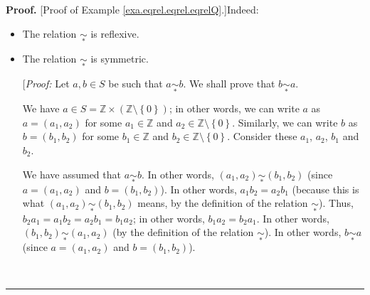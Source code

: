 \documentclass[numbers=enddot,12pt,final,onecolumn,notitlepage]{scrartcl}%
\numberwithin{exer}{subsection}
\theoremstyle{definition}
\newenvironment{fineprint}{\begin{small}}{\end{small}}
\newenvironment{proof}[1][Proof]{\noindent\textbf{#1.} }{\ \rule{0.5em}{0.5em}}
\begin{document}
\begin{proof}
[Proof of Example \ref{exa.eqrel.eqrel.eqrelQ}.]Indeed:

\begin{itemize}
\item The relation $\underset{\ast}{\sim}$ is reflexive.

\begin{fineprint}
[\textit{Proof:} Let $a\in S$. Thus, $a\in S=\mathbb{Z}\times\left(
\mathbb{Z}\setminus\left\{  0\right\}  \right)  $; in other words, we can
write $a$ as $a=\left(  a_{1},a_{2}\right)  $ for some $a_{1}\in\mathbb{Z}$
and $a_{2}\in\mathbb{Z}\setminus\left\{  0\right\}  $. Consider these $a_{1}$
and $a_{2}$.

Clearly, $a_{1}a_{2}=a_{2}a_{1}$. In other words, $\left(  a_{1},a_{2}\right)
\underset{\ast}{\sim}\left(  a_{1},a_{2}\right)  $ (because the definition of
the relation $\underset{\ast}{\sim}$ yields that $\left(  a_{1},a_{2}\right)
\underset{\ast}{\sim}\left(  a_{1},a_{2}\right)  $ means $a_{1}a_{2}%
=a_{2}a_{1}$). In other words, $a\underset{\ast}{\sim}a$ (since $a=\left(
a_{1},a_{2}\right)  $).

Now, forget that we fixed $a$. We thus have shown that every $a\in S$
satisfies $a\underset{\ast}{\sim}a$. In other words, the relation
$\underset{\ast}{\sim}$ is reflexive.]
\end{fineprint}

\item The relation $\underset{\ast}{\sim}$ is symmetric.

\begin{fineprint}
[\textit{Proof:} Let $a,b\in S$ be such that $a\underset{\ast}{\sim}b$. We
shall prove that $b\underset{\ast}{\sim}a$.

We have $a\in S=\mathbb{Z}\times\left(  \mathbb{Z}\setminus\left\{  0\right\}
\right)  $; in other words, we can write $a$ as $a=\left(  a_{1},a_{2}\right)
$ for some $a_{1}\in\mathbb{Z}$ and $a_{2}\in\mathbb{Z}\setminus\left\{
0\right\}  $. Similarly, we can write $b$ as $b=\left(  b_{1},b_{2}\right)  $
for some $b_{1}\in\mathbb{Z}$ and $b_{2}\in\mathbb{Z}\setminus\left\{
0\right\}  $. Consider these $a_{1}$, $a_{2}$, $b_{1}$ and $b_{2}$.

We have assumed that $a\underset{\ast}{\sim}b$. In other words, $\left(
a_{1},a_{2}\right)  \underset{\ast}{\sim}\left(  b_{1},b_{2}\right)  $ (since
$a=\left(  a_{1},a_{2}\right)  $ and $b=\left(  b_{1},b_{2}\right)  $). In
other words, $a_{1}b_{2}=a_{2}b_{1}$ (because this is what $\left(
a_{1},a_{2}\right)  \underset{\ast}{\sim}\left(  b_{1},b_{2}\right)  $ means,
by the definition of the relation $\underset{\ast}{\sim}$). Thus, $b_{2}%
a_{1}=a_{1}b_{2}=a_{2}b_{1}=b_{1}a_{2}$; in other words, $b_{1}a_{2}%
=b_{2}a_{1}$. In other words, $\left(  b_{1},b_{2}\right)  \underset{\ast
}{\sim}\left(  a_{1},a_{2}\right)  $ (by the definition of the relation
$\underset{\ast}{\sim}$). In other words, $b\underset{\ast}{\sim}a$ (since
$a=\left(  a_{1},a_{2}\right)  $ and $b=\left(  b_{1},b_{2}\right)  $).


\end{fineprint}
\end{itemize}
\end{proof}
\end{document}
